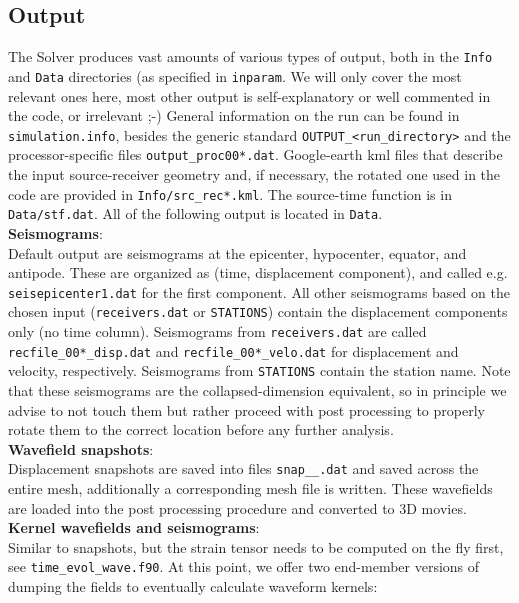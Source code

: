\documentclass[11pt,letter,fleqn,english,notitlepage]{article}
\begin{document}
\subsection{Output}
The Solver produces vast amounts of various types of output, 
both in the {\tt Info} and {\tt Data} directories (as specified in {\tt inparam}. We will 
only cover the most relevant ones here, most other output is self-explanatory 
or well commented in the code, or irrelevant ;-)
General information on the run can be found in {\tt simulation.info}, besides 
the generic standard {\tt OUTPUT\_<run\_directory>} and the processor-specific files
{\tt output\_proc00*.dat}. Google-earth kml files that describe the input source-receiver
geometry and, if necessary, the rotated one used in the code are provided in {\tt Info/src\_rec*.kml}.
The source-time function is in {\tt Data/stf.dat}. All of the following output is located in {\tt Data}.\\

\noindent \textbf{Seismograms}: \\
Default output are seismograms at the epicenter, hypocenter,
equator, and antipode. These are organized as (time, displacement component), and 
called e.g. {\tt seisepicenter1.dat} for the first component.
All other seismograms based on the chosen input 
({\tt receivers.dat} or {\tt STATIONS}) contain the displacement 
components only (no time column). Seismograms from {\tt receivers.dat} are called 
{\tt recfile\_00*\_disp.dat} and {\tt recfile\_00*\_velo.dat} for displacement and velocity, respectively.
Seismograms from {\tt STATIONS} contain the station name. Note that these seismograms 
are the collapsed-dimension equivalent, so in principle we advise to not touch them but 
rather proceed with post processing to properly rotate them to the correct location before 
any further analysis.\\

\noindent \textbf{Wavefield snapshots}:\\
Displacement snapshots are saved into files {\tt snap\_<proc number>\_<time sample>.dat}
and saved across the entire mesh, additionally a corresponding mesh file is written.
These wavefields are loaded into the post processing procedure and converted to 3D 
movies.\\

\noindent \textbf{Kernel wavefields and seismograms}: \\
Similar to snapshots, but the strain tensor needs 
to be computed on the fly first, see {\tt time\_evol\_wave.f90}. 
At this point, we offer two end-member versions of dumping the fields  
to eventually calculate waveform kernels:
\end{document}
